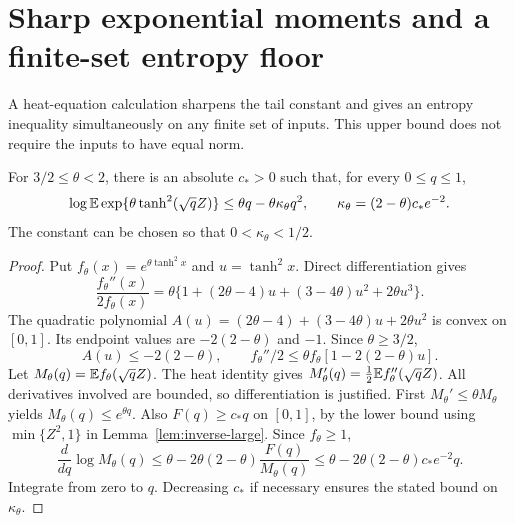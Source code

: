 \section{Sharp exponential moments and a finite-set entropy floor}
\label{sec:sharp-mgf}
A heat-equation calculation sharpens the tail constant and gives an entropy inequality simultaneously on any finite set of inputs. This upper bound does not require the inputs to have equal norm.

\begin{lemma}
\label{lem:heat}
For $3/2\le\theta<2$, there is an absolute $c_*>0$ such that, for every $0\le q\le1$,
\begin{equation}
 \log\mathbb E\exp\{\theta\tanh^2(\sqrt qZ)\}
 \le\theta q-\theta\kappa_\theta q^2,
 \qquad \kappa_\theta=(2-\theta)c_*e^{-2}.
 \label{eq:heat-bound}
\end{equation}
The constant can be chosen so that $0<\kappa_\theta<1/2$.
\end{lemma}
\begin{proof}
Put $f_\theta(x)=e^{\theta\tanh^2x}$ and $u=\tanh^2x$. Direct differentiation gives
\[
 \frac{f_\theta''(x)}{2f_\theta(x)}
 =\theta\{1+(2\theta-4)u+(3-4\theta)u^2+2\theta u^3\}.
\]
The quadratic polynomial
$A(u)=(2\theta-4)+(3-4\theta)u+2\theta u^2$ is convex on $[0,1]$. Its endpoint values are $-2(2-\theta)$ and $-1$. Since $\theta\ge3/2$,
\[
 A(u)\le-2(2-\theta),\qquad
 f_\theta''/2\le\theta f_\theta[1-2(2-\theta)u].
\]
Let $M_\theta(q)=\mathbb E f_\theta(\sqrt qZ)$. The heat identity gives
$M_\theta'(q)=\tfrac12\mathbb E f_\theta''(\sqrt qZ)$. All derivatives involved are bounded, so differentiation is justified. First $M_\theta'\le\theta M_\theta$ yields $M_\theta(q)\le e^{\theta q}$. Also $F(q)\ge c_*q$ on $[0,1]$, by the lower bound using $\min\{Z^2,1\}$ in Lemma~\ref{lem:inverse-large}. Since $f_\theta\ge1$,
\[
 \frac{d}{dq}\log M_\theta(q)
 \le\theta-2\theta(2-\theta)\frac{F(q)}{M_\theta(q)}
 \le\theta-2\theta(2-\theta)c_*e^{-2}q.
\]
Integrate from zero to $q$. Decreasing $c_*$ if necessary ensures the stated bound on $\kappa_\theta$.
\end{proof}

